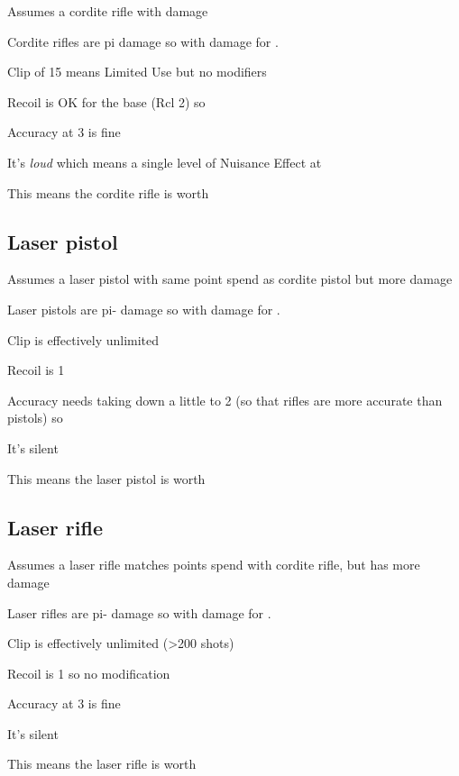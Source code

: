 Assumes a cordite rifle with  damage

\begin{innateattack}
  \item Cordite rifles are pi damage so  with
     damage for .
  \item Clip of 15 means Limited Use but no modifiers
  \item Recoil is OK for the base (Rcl 2) so 
  \item Accuracy at 3 is fine
  \item It's \emph{loud} which means a single level of Nuisance Effect at
  \item This means the cordite rifle is worth \InnateAttackTotalPoints{}
\end{innateattack}


\subsection{Laser pistol}
\label{sec:laser-pistol}

Assumes a laser pistol with same point spend as cordite pistol but more damage

\begin{innateattack}
  \item Laser pistols are pi- damage so  with
     damage for .
  \item Clip is effectively unlimited
  \item Recoil is 1
  \item Accuracy needs taking down a little to 2 (so that rifles are more
    accurate than pistols) so 
  \item It's silent
  \item This means the laser pistol is worth \InnateAttackTotalPoints{}
\end{innateattack}


\subsection{Laser rifle}
\label{sec:laser-rifle}

Assumes a laser rifle matches points spend with cordite rifle, but has more damage

\begin{innateattack}
  \item Laser rifles are pi- damage so  with
     damage for .
  \item Clip is effectively unlimited (>200 shots)
  \item Recoil is 1 so no modification
  \item Accuracy at 3 is fine
  \item It's silent
  \item This means the laser rifle is worth \InnateAttackTotalPoints{}
\end{innateattack}

